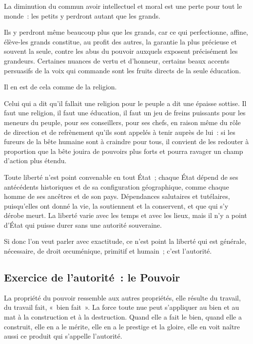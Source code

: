 \documentclass[french,twoside]{book} %
\newcommand{\astermono}{\medskip\centerline{\color{rubric}\large\selectfont{\syms ✻}}\medskip\par}%
\begin{document}
\noindent La diminution du commun avoir intellectuel et moral est une perte pour tout le monde : les petits y perdront autant que les grands.\par
Ils y perdront même beaucoup plus que les grands, car ce qui perfectionne, affine, élève-les grands constitue, au profit des autres, la garantie la plus précieuse et souvent la seule, contre les abus du pouvoir auxquels exposent précisément les grandeurs. Certaines nuances de vertu et d’honneur, certains beaux accents persuasifs de la voix qui commande sont les fruits directs de la seule éducation.\par
Il en est de cela comme de la religion.\par
Celui qui a dit qu’il fallait une religion pour le peuple a dit une épaisse sottise. Il faut une religion, il faut une éducation, il faut un jeu de freins puissants pour les meneurs du peuple, pour ses conseillers, pour ses chefs, en raison même du rôle de direction et de refrènement qu’ils sont appelés à tenir auprès de lui : si les fureurs de la bête humaine sont à craindre pour tous, il convient de les redouter à proportion que la bête jouira de pouvoirs plus forts et pourra ravager un champ d’action plus étendu.\par

\astermono

\noindent Toute liberté n’est point convenable en tout État ; chaque État dépend de ses antécédents historiques et de sa configuration géographique, comme chaque homme de ses ancêtres et de son pays. Dépendances salutaires et tutélaires, puisqu’elles ont donné la vie, la soutiennent et la conservent, et que qui s’y dérobe meurt. La liberté varie avec les temps et avec les lieux, mais il n’y a point d’État qui puisse durer sans une autorité souveraine.\par
Si donc l’on veut parler avec exactitude, ce n’est point la liberté qui est générale, nécessaire, de droit œcuménique, primitif et humain ; c’est l’autorité.\par

\astermono

\subsection[{Exercice de l’autorité : le Pouvoir}]{Exercice de l’autorité : le Pouvoir}
\noindent La propriété du pouvoir ressemble aux autres propriétés, elle résulte du travail, du travail fait, « bien fait ». La force toute nue peut s’appliquer au bien et au mat à la construction et à la destruction. Quand elle a fait le bien, quand elle a construit, elle en a le mérite, elle en a le prestige et la gloire, elle en voit naître aussi ce produit qui s’appelle l’autorité.\par
\end{document}
